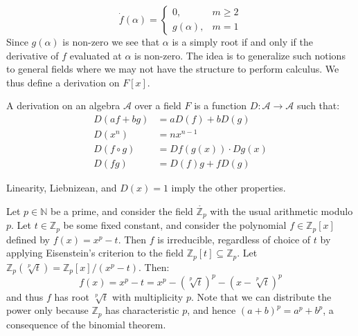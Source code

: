 \documentclass{article}                                                        %
\begin{document}
            \begin{equation}
                \dot{f}(\alpha)=
                \begin{cases}
                    0,&m\geq{2}\\
                    g(\alpha),&m=1
                \end{cases}
            \end{equation}
            Since $g(\alpha)$ is non-zero we see that $\alpha$ is a simply root
            if and only if the derivative of $f$ evaluated at $\alpha$ is
            non-zero. The idea is to generalize such notions to general fields
            where we may not have the structure to perform calculus. We thus
            define a derivation on $F[x]$.
            \begin{definition}
                A derivation on an algebra $\mathscr{A}$ over a field $F$ is a
                function $D:\mathscr{A}\rightarrow\mathscr{A}$ such that:
                \begin{align}
                    D(af+bg)&=aD(f)+bD(g)\\
                    D(x^{n})&=nx^{n-1}\\
                    D(f\circ{g})&=Df(g(x))\cdot{D}g(x)\\
                    D(fg)&=D(f)g+fD(g)
                \end{align}
            \end{definition}
            \begin{theorem}
                Linearity, Liebnizean, and $D(x)=1$ imply the other properties.
            \end{theorem}
            \begin{example}
                Let $p\in\mathbb{N}$ be a prime, and consider the field
                $\ring{\mathbb{Z}_{p}}$ with the usual arithmetic modulo $p$.
                Let $t\in\mathbb{Z}_{p}$ be some fixed constant, and consider
                the polynomial $f\in\mathbb{Z}_{p}[x]$ defined by
                $f(x)=x^{p}-t$. Then $f$ is irreducible, regardless of choice of
                $t$ by applying Eisenstein's criterion to the field
                $\mathbb{Z}_{p}[t]\subseteq\mathbb{Z}_{p}$. Let
                $\mathbb{Z}_{p}(\sqrt[p]{t})=\mathbb{Z}_{p}[x]/(x^{p}-t)$. Then:
                \begin{equation}
                    f(x)=x^{p}-t=x^{p}-(\sqrt[p]{t})^{p}-(x-\sqrt[p]{t})^{p}
                \end{equation}
                and thus $f$ has root $\sqrt[p]{t}$ with multiplicity $p$. Note
                that we can distribute the power only because $\mathbb{Z}_{p}$
                has characteristic $p$, and hence $(a+b)^{p}=a^{p}+b^{p}$,
                a consequence of the binomial theorem.
            \end{example}
\end{document}
